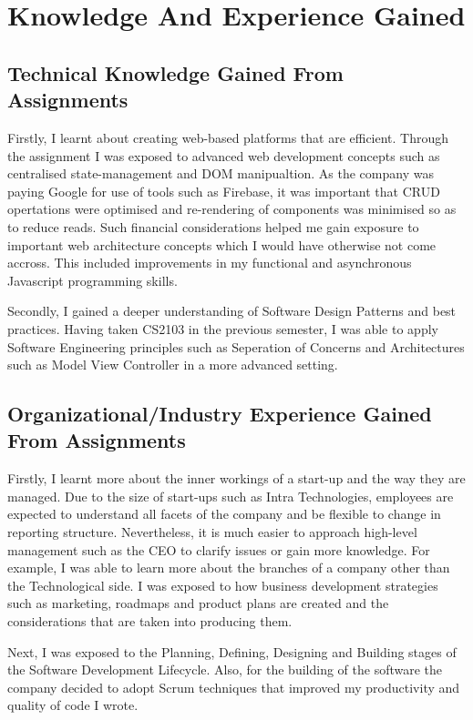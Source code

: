 \section{Knowledge And Experience Gained}
\subsection{Technical Knowledge Gained From Assignments}
\noindent
Firstly, I learnt about creating web-based platforms that are efficient. Through the assignment I was exposed to advanced web development concepts such as centralised state-management and DOM manipualtion. As the company was paying Google for use of tools such as Firebase, it was important that
CRUD opertations were optimised and re-rendering of components was minimised so as to reduce reads. Such financial considerations helped me gain exposure to important web architecture concepts which I would have otherwise
not come accross. This included improvements in my functional and asynchronous Javascript programming skills.

\noindent
Secondly, I gained a deeper understanding of Software Design Patterns and best practices. Having taken CS2103 in the previous semester, I was able to apply Software Engineering principles such as Seperation of Concerns and
Architectures such as Model View Controller in a more advanced setting.

\subsection{Organizational/Industry Experience Gained From Assignments}
\noindent 
Firstly, I learnt more about the inner workings of a start-up and the way they are managed. Due to the size of start-ups such as Intra Technologies, employees are expected to understand all facets of the
company and be flexible to change in reporting structure. Nevertheless, it is much easier
to approach high-level management such as the CEO to clarify issues or gain more knowledge. For example, I was able to learn more about the branches of a company other than the Technological side. I was exposed to how
business development strategies such as marketing, roadmaps and product plans are created and the considerations that are taken into producing them.

\noindent
Next, I was exposed to the Planning, Defining, Designing and Building stages of the Software Development Lifecycle. Also, for the building of the software the company decided to adopt Scrum techniques that
improved my productivity and quality of code I wrote.


